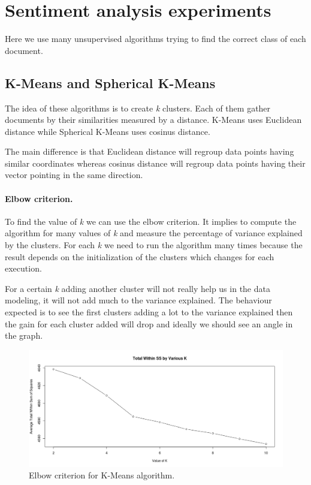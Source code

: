 \documentclass{article}
\begin{document}
\section{Sentiment analysis experiments}

Here we use many unsupervised algorithms trying to find the correct class of each document.


\subsection{K-Means and Spherical K-Means}

The idea of these algorithms is to create \textit{k} clusters. Each of them gather documents by their similarities measured by a distance. K-Means uses Euclidean distance while Spherical K-Means uses cosinus distance.

The main difference is that Euclidean distance will regroup data points having similar coordinates whereas cosinus distance will regroup data points having their vector pointing in the same direction.

\paragraph{Elbow criterion.}
To find the value of \textit{k} we can use the elbow criterion. It implies to compute the algorithm for many values of \textit{k} and measure the percentage of variance explained by the clusters. For each \textit{k} we need to run the algorithm many times because the result depends on the initialization of the clusters which changes for each execution.

For a certain \textit{k} adding another cluster will not really help us in the data modeling, it will not add much to the variance explained. The behaviour expected is to see the first clusters adding a lot to the variance explained then the gain for each cluster added will drop and ideally we should see an angle in the graph.

\begin{figure}[H] 
\centering
\includegraphics[width=\textwidth]{Kmeans_tf-idf-l2_elbow_criterion.png}
\caption{Elbow criterion for K-Means algorithm.}
\label{fig:elbow}
\end{figure}
\end{document}
